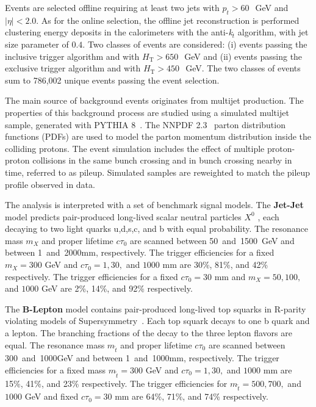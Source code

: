 Events are selected offline requiring at least two jets with
$p_{t}>60~$~GeV and $|\eta|<2.0$. As for the online selection, the
offline jet reconstruction is performed clustering energy deposits in
the calorimeters with the anti-\textit{k}$_{\textit{t}}$ algorithm,
with jet size parameter of $0.4$. Two classes of events are
considered: (i) events passing the inclusive trigger algorithm and
with $H_{\textrm{T}}>650~$~GeV and (ii) events passing the exclusive
trigger algorithm and with $H_{\textrm{T}}>450~$~GeV. The two classes 
of events sum to 786,002 unique events passing the event selection.  

The main source of background events originates from multijet
production. The properties of this background process are studied
using a simulated multijet sample, generated with
PYTHIA 8~\cite{Sjostrand:2007gs}. The NNPDF 2.3~\cite{NNPDF23}
parton distribution functions (PDFs) are used to model the parton
momentum distribution inside the colliding protons. The event
simulation includes the effect of multiple proton-proton collisions in
the same bunch crossing and in bunch crossing nearby in time, referred
to as pileup. Simulated samples are reweighted to match the pileup
profile observed in data.

The analysis is interpreted with a set of benchmark signal models.
The \textbf{Jet-Jet} model predicts pair-produced long-lived
scalar neutral particles $X^{0}$ \cite{ScalarX}, each decaying to two light quarks u,d,s,c, and b
with equal probability. The resonance
mass $m_X$ and proper lifetime $c\tau_0$ are scanned between
50~and~1500~GeV and between 1~and~2000mm, respectively. The
trigger efficiencies for a fixed  $m_X=300$ GeV and 
$c\tau_0 = 1, 30,$ and $1000$ mm are 30\%, 81\%, and 42\%  
 respectively. The trigger efficiencies for a fixed  $c\tau_0=30$
 mm and $m_{X} = 50, 100,$ and $1000$ GeV
 are 2\%, 14\%, and 92\%  respectively.

The \textbf{B-Lepton} model contains pair-produced long-lived top squarks
in R-parity violating models of Supersymmetry~\cite{DisplacedSUSY}. Each top squark decays
to one b quark and a lepton. The branching fractions of the
decay to the three lepton flavors are equal. The
resonance mass $m_{\tilde{t}}$ and proper lifetime $c\tau_0$ are
scanned between 300~and~1000GeV and between 1~and~1000mm,
respectively. The trigger efficiencies for a fixed mass 
$m_{\tilde{t}}=300$ GeV and $c\tau_0 = 1, 30,$ and $1000$ mm
 are 15\%, 41\%, and 23\%  respectively.
The trigger efficiencies for  $m_{\tilde{t}} = 500, 700,$ and $1000$ GeV and fixed  $c\tau_0=30$ mm are 64\%, 71\%, and 74\% respectively.

